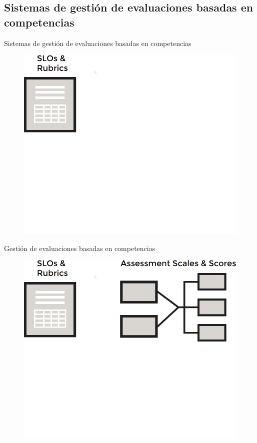 \documentclass[10pt,xcolor=table ]{beamer}
\begin{document}
\subsection{Sistemas de gestión de evaluaciones basadas en competencias}
\begin{frame}{Sistemas de gestión de evaluaciones basadas en competencias}
	\begin{figure}
		\centering
	    \includegraphics[scale=0.55]{../Figuras/ams/ams_1}
	\end{figure}
\end{frame}

\begin{frame}{Gestión de evaluaciones basadas en competencias}
	\begin{figure}
		\centering
	    \includegraphics[scale=0.55]{../Figuras/ams/ams_2}
	\end{figure}
\end{frame}
\end{document}
